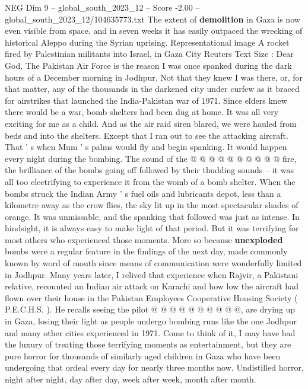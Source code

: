 \begin{textsample}{NEG Dim 9 – global\_south\_2023\_12 – Score -2.00 – global\_south\_2023\_12/104635773.txt}  \label{ex:f9_neg_438}
The extent of \textbf{demolition} in Gaza is now even visible from space, and in seven weeks it has easily outpaced the wrecking of historical Aleppo during the Syrian uprising.
Representational image A rocket fired by Palestinian militants into Israel, in Gaza City Reuters Text Size : Dear God, The Pakistan Air Force is the reason I was once spanked during the dark hours of a December morning in Jodhpur.
Not that they knew I was there, or, for that matter, any of the thousands in the darkened city under curfew as it braced for airstrikes that launched the India-Pakistan war of 1971.
Since elders knew there would be a war, bomb shelters had been dug at home.
It was all very exciting for me as a child.
And as the air raid siren blared, we were hauled from beds and into the shelters.
Except that I ran out to see the attacking aircraft.
That ' s when Mum ' s palms would fly and begin spanking.
It would happen every night during the bombing.
The sound of the @ @ @ @ @ @ @ @ @ @ fire, the brilliance of the bombs going off followed by their thudding sounds -- it was all too electrifying to experience it from the womb of a bomb shelter.
When the bombs struck the Indian Army ' s fuel oils and lubricants depot, less than a kilometre away as the crow flies, the sky lit up in the most spectacular shades of orange.
It was unmissable, and the spanking that followed was just as intense.
In hindsight, it is always easy to make light of that period.
But it was terrifying for most others who experienced those moments.
More so because \textbf{unexploded} bombs were a regular feature in the findings of the next day, made commonly known by word of mouth since means of communication were wonderfully limited in Jodhpur.
Many years later, I relived that experience when Rajvir, a Pakistani relative, recounted an Indian air attack on Karachi and how low the aircraft had flown over their house in the Pakistan Employees Cooperative Housing Society ( P.E.C.H.S. ).
He recalls seeing the pilot @ @ @ @ @ @ @ @ @ @, are drying up in Gaza, losing their light as people undergo bombing runs like the one Jodhpur and many other cities experienced in 1971.
Come to think of it, I may have had the luxury of treating those terrifying moments as entertainment, but they are pure horror for thousands of similarly aged children in Gaza who have been undergoing that ordeal every day for nearly three months now.
Undistilled horror, night after night, day after day, week after week, month after month.

\end{textsample}
